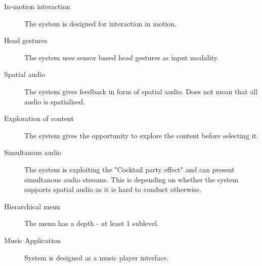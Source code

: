 \begin{description}
\item[In-motion interaction]
The system is designed for interaction in motion.

\item[Head gestures]
The system uses sensor based head gestures as input modality.

\item[Spatial audio]
The system gives feedback in form of spatial audio. Does not mean that all audio is spatialised.

\item[Exploration of content]
The system gives the opportunity to explore the content before selecting it.

\item[Simultanous audio]
The system is exploiting the "Cocktail party effect" and can present simultanous audio streams. This is depending on whether the system supports spatial audio as it is hard to conduct otherwise.

\item[Hierarchical menu]
The menu has a depth - at least 1 sublevel.

\item[Music Application]
System is designed as a music player interface.
\end{description}


